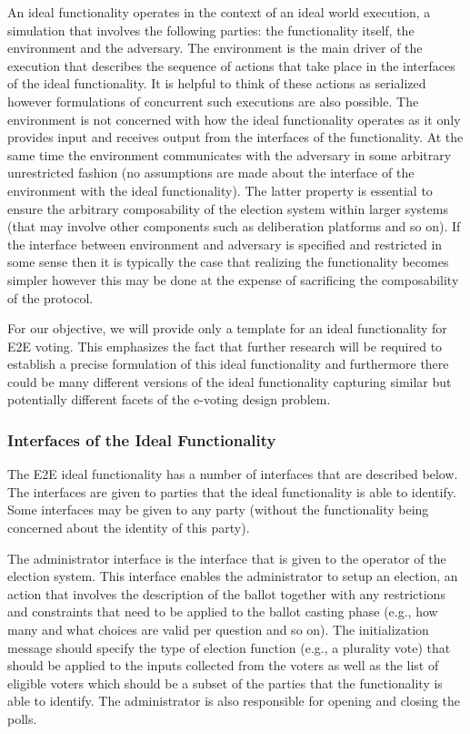 An ideal functionality operates in the context of an ideal world
execution, a simulation that involves the following parties: the
functionality itself, the environment and the adversary. The
environment is the main driver of the execution that describes the
sequence of actions that take place in the interfaces of the ideal
functionality. It is helpful to think of these actions as serialized
however formulations of concurrent such executions are also
possible. The environment is not concerned with how the ideal
functionality operates as it only provides input and receives output
from the interfaces of the functionality. At the same time the
environment communicates with the adversary in some arbitrary
unrestricted fashion (no assumptions are made about the interface of
the environment with the ideal functionality). The latter property is
essential to ensure the arbitrary composability of the election system
within larger systems (that may involve other components such as
deliberation platforms and so on). If the interface between
environment and adversary is specified and restricted in some sense
then it is typically the case that realizing the functionality becomes
simpler however this may be done at the expense of sacrificing the
composability of the protocol.

For our objective, we will provide only a template for an ideal
functionality for E2E voting. This emphasizes the fact that further
research will be required to establish a precise formulation of this
ideal functionality and furthermore there could be many different
versions of the ideal functionality capturing similar but potentially
different facets of the e-voting design problem.

\subsubsection{Interfaces of the Ideal Functionality}

The E2E ideal functionality has a number of interfaces that are
described below. The interfaces are given to parties that the ideal
functionality is able to identify. Some interfaces may be given to any
party (without the functionality being concerned about the identity of
this party).

The administrator interface is the interface that is given to the
operator of the election system. This interface enables the
administrator to setup an election, an action that involves the
description of the ballot together with any restrictions and
constraints that need to be applied to the ballot casting phase (e.g.,
how many and what choices are valid per question and so on). The
initialization message should specify the type of election function
(e.g., a plurality vote) that should be applied to the inputs
collected from the voters as well as the list of eligible voters which
should be a subset of the parties that the functionality is able to
identify. The administrator is also responsible for opening and
closing the polls.

